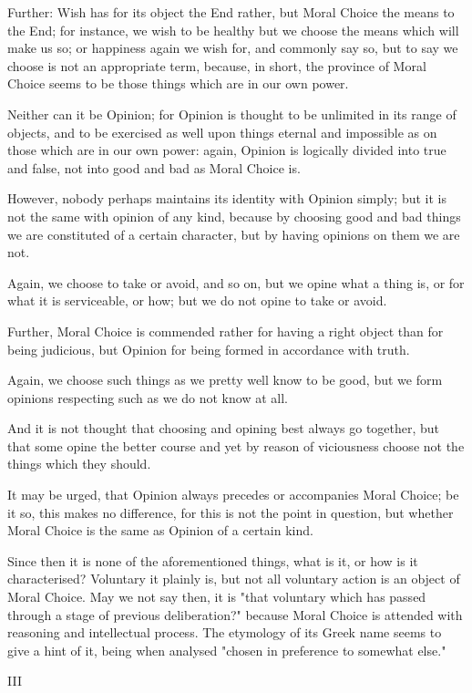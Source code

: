 Further: Wish has for its object the End rather, but Moral Choice the
means to the End; for instance, we wish to be healthy but we choose
the means which will make us so; or happiness again we wish for, and
commonly say so, but to say we choose is not an appropriate term,
because, in short, the province of Moral Choice seems to be those things
which are in our own power.

Neither can it be Opinion; for Opinion is thought to be unlimited in its
range of objects, and to be exercised as well upon things eternal and
impossible as on those which are in our own power: again, Opinion is
logically divided into true and false, not into good and bad as Moral
Choice is.

However, nobody perhaps maintains its identity with Opinion simply; but
it is not the same with opinion of any kind, because by choosing good
and bad things we are constituted of a certain character, but by having
opinions on them we are not.

Again, we choose to take or avoid, and so on, but we opine what a thing
is, or for what it is serviceable, or how; but we do not opine to take
or avoid.

Further, Moral Choice is commended rather for having a right object than
for being judicious, but Opinion for being formed in accordance with
truth.

Again, we choose such things as we pretty well know to be good, but we
form opinions respecting such as we do not know at all.

And it is not thought that choosing and opining best always go together,
but that some opine the better course and yet by reason of viciousness
choose not the things which they should.

It may be urged, that Opinion always precedes or accompanies Moral
Choice; be it so, this makes no difference, for this is not the point in
question, but whether Moral Choice is the same as Opinion of a certain
kind.

Since then it is none of the aforementioned things, what is it, or how
is it characterised? Voluntary it plainly is, but not all voluntary
action is an object of Moral Choice. May we not say then, it is "that
voluntary which has passed through a stage of previous deliberation?"
because Moral Choice is attended with reasoning and intellectual
process. The etymology of its Greek name seems to give a hint of it,
being when analysed "chosen in preference to somewhat else."


III

